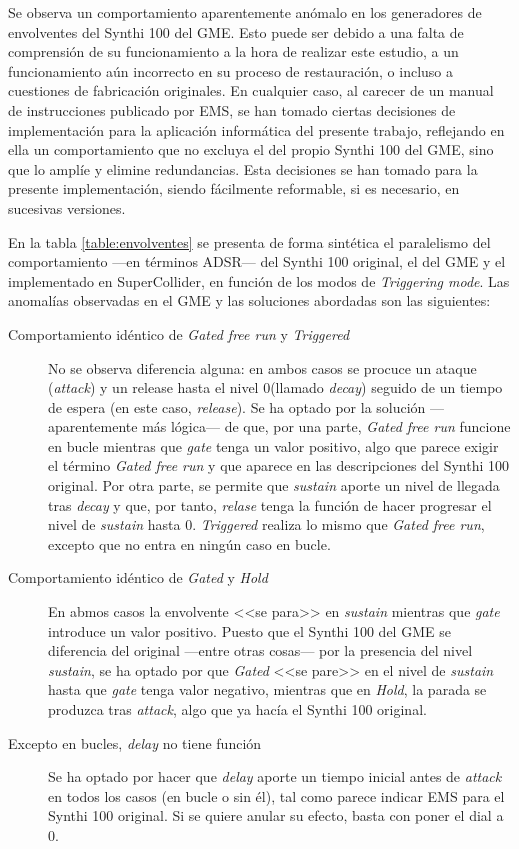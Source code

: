 Se observa un comportamiento aparentemente anómalo en los generadores de envolventes del Synthi 100 del GME. Esto puede ser debido a una falta de comprensión de su funcionamiento a la hora de realizar este estudio, a un funcionamiento aún incorrecto en su proceso de restauración, o incluso a cuestiones de fabricación originales. En cualquier caso, al carecer de un manual de instrucciones publicado por EMS, se han tomado ciertas decisiones de implementación para la aplicación informática del presente trabajo, reflejando en ella un comportamiento que no excluya el del propio Synthi 100 del GME, sino que lo amplíe y elimine redundancias. Esta decisiones se han tomado para la presente implementación, siendo fácilmente reformable, si es necesario, en sucesivas versiones.

En la tabla \ref{table:envolventes} se presenta de forma sintética el paralelismo del comportamiento ---en términos ADSR--- del Synthi 100 original, el del GME y el implementado en SuperCollider, en función de los modos de \textit{Triggering mode}. Las anomalías observadas en el GME y las soluciones abordadas son las siguientes:
\begin{description}
	\item[Comportamiento idéntico de \textit{Gated free run} y \textit{Triggered}] No se observa diferencia alguna: en ambos casos se procuce un ataque (\textit{attack}) y un release hasta el nivel 0(llamado \textit{decay}) seguido de un tiempo de espera (en este caso, \textit{release}). Se ha optado por la solución ---aparentemente más lógica--- de que, por una parte, \textit{Gated free run} funcione en bucle mientras que \textit{gate} tenga un valor positivo, algo que parece exigir el término \textit{Gated free run} y que aparece en las descripciones del Synthi 100 original. Por otra parte, se permite que \textit{sustain} aporte un nivel de llegada tras \textit{decay} y que, por tanto, \textit{relase} tenga la función de hacer progresar el nivel de \textit{sustain} hasta 0. \textit{Triggered} realiza lo mismo que \textit{Gated free run}, excepto que no entra en ningún caso en bucle.
	\item[Comportamiento idéntico de \textit{Gated} y \textit{Hold}] En abmos casos la envolvente <<se para>> en \textit{sustain} mientras que \textit{gate} introduce un valor positivo. Puesto que el Synthi 100 del GME se diferencia del original ---entre otras cosas--- por la presencia del nivel \textit{sustain}, se ha optado por que \textit{Gated} <<se pare>> en el nivel de \textit{sustain} hasta que \textit{gate} tenga valor negativo, mientras que en \textit{Hold}, la parada se produzca tras \textit{attack}, algo que ya hacía el Synthi 100 original.
	\item[Excepto en bucles, \textit{delay} no tiene función] Se ha optado por hacer que  \textit{delay}  aporte un tiempo inicial antes de \textit{attack} en todos los casos (en bucle o sin él), tal como parece indicar EMS para el Synthi 100 original. Si se quiere anular su efecto, basta con poner el dial a 0.
\end{description}

